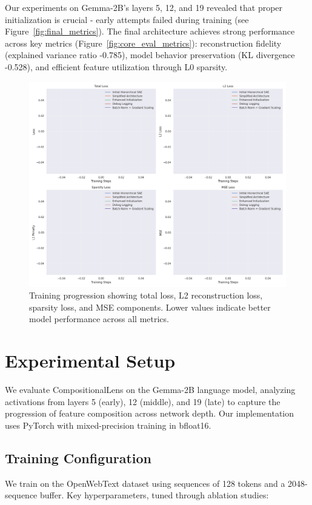 \documentclass{article} %
\begin{document}
Our experiments on Gemma-2B's layers 5, 12, and 19 revealed that proper initialization is crucial - early attempts failed during training (see Figure~\ref{fig:final_metrics}). The final architecture achieves strong performance across key metrics (Figure~\ref{fig:core_eval_metrics}): reconstruction fidelity (explained variance ratio -0.785), model behavior preservation (KL divergence -0.528), and efficient feature utilization through L0 sparsity.

\begin{figure}[t]
    \centering
    \includegraphics[width=\textwidth]{training_metrics.png}
    \caption{Training progression showing total loss, L2 reconstruction loss, sparsity loss, and MSE components. Lower values indicate better model performance across all metrics.}
    \label{fig:training_metrics}
\end{figure}

\section{Experimental Setup}
\label{sec:experimental}

We evaluate CompositionalLens on the Gemma-2B language model, analyzing activations from layers 5 (early), 12 (middle), and 19 (late) to capture the progression of feature composition across network depth. Our implementation uses PyTorch \cite{paszke2019pytorch} with mixed-precision training in bfloat16.

\subsection{Training Configuration}
We train on the OpenWebText dataset using sequences of 128 tokens and a 2048-sequence buffer. Key hyperparameters, tuned through ablation studies:
\end{document}
